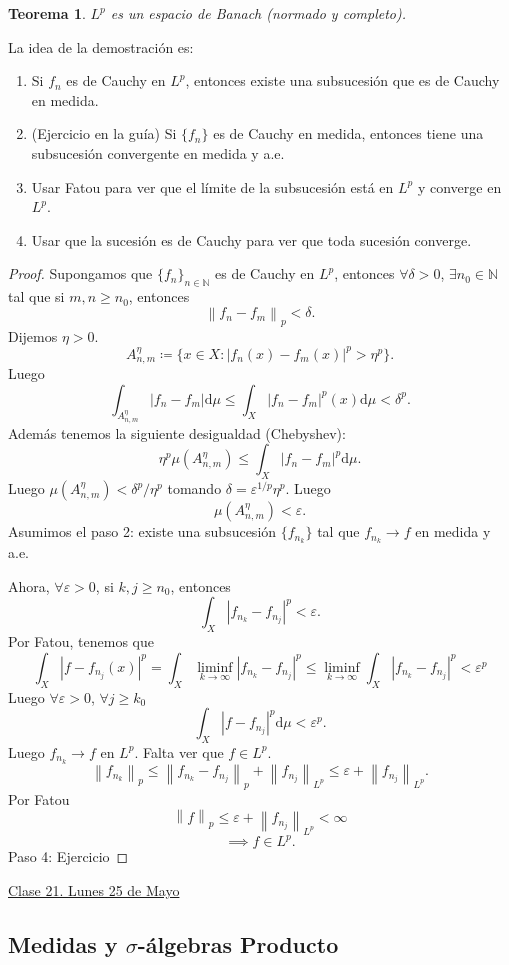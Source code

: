 \documentclass{article}
\newtheorem{theorem}{Teorema}[subsection]
\theoremstyle{definition}
\theoremstyle{remark}
\numberwithin{equation}{section}
\newcommand{\N}{\mathbb{N}}
\renewcommand{\d}{\mathrm{d}}
\newcommand{\e}{\varepsilon}
\newcommand{\oo}{\infty}
\newcommand{\abs}[1]{\left| #1 \right|}
\newcommand{\norm}[1]{\left\lVert #1 \right\rVert}
\newcommand{\fecha}[1]{\begin{flushright} \underline{#1} \end{flushright}}
\begin{document}
\begin{theorem}
  $L^p$ es un espacio de Banach (normado y completo).
\end{theorem}
La idea de la demostración es:
\begin{enumerate}[(1)]
  \item Si $f_n$ es de Cauchy en $L^p$, entonces existe una subsucesión que es de Cauchy en medida.
  \item (Ejercicio en la guía) Si $\{f_n\}$ es de Cauchy en medida, entonces tiene una subsucesión convergente en medida y a.e.
  \item Usar Fatou para ver que el límite de la subsucesión está en $L^p$ y converge en $L^p$.
  \item Usar que la sucesión es de Cauchy para ver que toda sucesión converge.
\end{enumerate}
\begin{proof}
  Supongamos que $\{f_n\}_{n\in\N}$ es de Cauchy en $L^p$, entonces $\forall \delta > 0$, $\exists n_0 \in \N$ tal que si $m,n \geq n_0$, entonces 
  \[ \norm{f_n - f_m}_p < \delta. \]
  Dijemos $\eta > 0$. 
  \[ A_{n,m}^\eta \coloneqq \{x \in X \colon \abs{f_n(x) - f_m(x)}^p > \eta^p\}. \]
  Luego 
  \[ \int_{A_{n,m}^\eta} \abs{f_n - f_m} \d\mu \leq \int_X \abs{f_n - f_m}^p(x) \d\mu < \delta^p. \]
  Además tenemos la siguiente desigualdad (Chebyshev): 
  \[ \eta^p \mu(A_{n,m}^\eta) \leq \int_X \abs{f_n - f_m}^p \d\mu. \]
  Luego $\mu(A_{n,m}^\eta) < \delta^p/\eta^p$ tomando $\delta = \e^{1/p} \eta^p$.
  Luego 
  \[ \mu(A_{n,m}^\eta) < \e. \]
  Asumimos el paso 2: %
  existe una subsucesión $\{f_{n_k}\}$ tal que $f_{n_k} \to f$ en medida y a.e.

  Ahora, $\forall \e>0$, si $k,j \geq n_0$, entonces 
  \[ \int_X \abs{f_{n_k} - f_{n_j}}^p < \e. \]
  Por Fatou, tenemos que 
  \[ \int_X \abs{f - f_{n_j}(x)}^p = \int_X \liminf_{k \to \oo} \abs{f_{n_k} - f_{n_j}}^p \leq \liminf_{k\to\oo} \int_X \abs{f_{n_k} - f_{n_j}}^p < \e^p \]
  Luego $\forall \e>0$, $\forall j \geq k_0$ 
  \[ \int_X \abs{f - f_{n_j}}^p \d\mu < \e^p. \]
  Luego $f_{n_k} \to f$ en $L^p$. Falta ver que $f \in L^p$. 
  \[ \norm{f_{n_k}}_p \leq \norm{f_{n_k} - f_{n_j}}_p + \norm{f_{n_j}}_{L^p} \leq \e + \norm{f_{n_j}}_{L^p}. \]
  Por Fatou 
  \[ \norm{f}_p \leq \e + \norm{f_{n_j}}_{L^p} < \oo \] 
  \[ \implies f \in L^p. \]
  Paso 4: Ejercicio %
\end{proof}

\newpage
\fecha{Clase 21. Lunes 25 de Mayo}
\subsection{Medidas y \texorpdfstring{$\sigma$}{sigma}-álgebras Producto}
\end{document}
